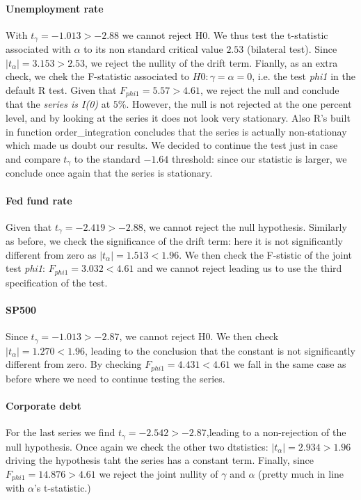\documentclass[hidelinks,12pts]{article}
\DeclareMathOperator{\1}{\mathbbm{1}}
\begin{document}
\paragraph{Unemployment rate}
With $t_\gamma = -1.013> -2.88$ we cannot reject H0. 
We thus test the t-statistic associated with $\alpha$ to its non standard critical value $2.53$ (bilateral test). 
Since $|t_\alpha| = 3.153 > 2.53$, we reject the nullity of the drift term. 
Fianlly, as an extra check, we chek the F-statistic associated to $H0: \gamma= \alpha = 0$, i.e. the test \emph{phi1} in the default R test. 
Given that $F_{phi1} = 5.57 > 4.61$, we reject the null and conclude that the \emph{series is I(0)} at $5\%$. 
However, the null is not rejected at the one percent level, and by looking at the series it does not look very stationary. Also R's built in function order_integration concludes that the series is actually non-stationay which made us doubt our results. We decided to continue the test just in case and compare $t_\gamma$ to the standard $-1.64$ threshold: since our statistic is larger, we conclude once again that the series is stationary.


\paragraph{Fed fund rate}
Given that $t_\gamma = -2.419 >-2.88$, we cannot reject the null hypothesis. 
Similarly as before, we check the significance of the drift term: here it is not significantly different from zero as $|t_\alpha| = 1.513 <1.96$.
We then check the F-stistic of the joint test \emph{phi1}: $F_{phi1} = 3.032 < 4.61$ and we cannot reject leading us to use the third specification of the test.  %

\paragraph{SP500}
Since $t_\gamma = -1.013> -2.87$, we cannot reject H0.
We then check $|t_\alpha| = 1.270 <1.96$, leading to the conclusion that the constant is not significantly different from zero. 
By checking $F_{phi1} = 4.431 <4.61$ we fall in the same case as before where we need to continue testing the series. 

\paragraph{Corporate debt}
For the last series we find $t_\gamma = -2.542 > -2.87$,leading to a non-rejection of the null hypothesis. 
Once again we check the other two dtstistics: $|t_\alpha| = 2.934 > 1.96$ driving the hypothesis taht the series has a constant term. 
Finally, since $F_{phi1} = 14.876 > 4.61$ we reject the joint nullity of $\gamma$ and $\alpha$ (pretty much in line with $\alpha$'s t-statistic.) 
\end{document}
